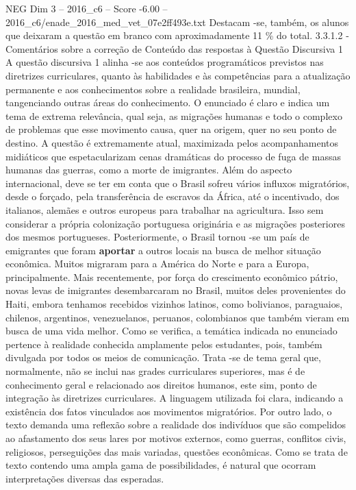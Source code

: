 \begin{textsample}{NEG Dim 3 – 2016\_c6 – Score -6.00 – 2016\_c6/enade\_2016\_med\_vet\_07e2ff493e.txt}
Destacam -se, também, os alunos que deixaram a questão em branco com aproximadamente 11 \% do total. 3.3.1.2 - Comentários sobre a correção de Conteúdo das respostas à Questão Discursiva 1 A questão discursiva 1 alinha -se aos conteúdos programáticos previstos nas diretrizes curriculares, quanto às habilidades e às competências para a atualização permanente e aos conhecimentos sobre a realidade brasileira, mundial, tangenciando outras áreas do conhecimento.
O enunciado é claro e indica um tema de extrema relevância, qual seja, as migrações humanas e todo o complexo de problemas que esse movimento causa, quer na origem, quer no seu ponto de destino.
A questão é extremamente atual, maximizada pelos acompanhamentos midiáticos que espetacularizam cenas dramáticas do processo de fuga de massas humanas das guerras, como a morte de imigrantes.
Além do aspecto internacional, deve se ter em conta que o Brasil sofreu vários influxos migratórios, desde o forçado, pela transferência de escravos da África, até o incentivado, dos italianos, alemães e outros europeus para trabalhar na agricultura.
Isso sem considerar a própria colonização portuguesa originária e as migrações posteriores dos mesmos portugueses.
Posteriormente, o Brasil tornou -se um país de emigrantes que foram \textbf{aportar} a outros locais na busca de melhor situação econômica.
Muitos migraram para a América do Norte e para a Europa, principalmente.
Mais recentemente, por força do crescimento econômico pátrio, novas levas de imigrantes desembarcaram no Brasil, muitos deles provenientes do Haiti, embora tenhamos recebidos vizinhos latinos, como bolivianos, paraguaios, chilenos, argentinos, venezuelanos, peruanos, colombianos que também vieram em busca de uma vida melhor.
Como se verifica, a temática indicada no enunciado pertence à realidade conhecida amplamente pelos estudantes, pois, também divulgada por todos os meios de comunicação.
Trata -se de tema geral que, normalmente, não se inclui nas grades curriculares superiores, mas é de conhecimento geral e relacionado aos direitos humanos, este sim, ponto de integração às diretrizes curriculares.
A linguagem utilizada foi clara, indicando a existência dos fatos vinculados aos movimentos migratórios.
Por outro lado, o texto demanda uma reflexão sobre a realidade dos indivíduos que são compelidos ao afastamento dos seus lares por motivos externos, como guerras, conflitos civis, religiosos, perseguições das mais variadas, questões econômicas.
Como se trata de texto contendo uma ampla gama de possibilidades, é natural que ocorram interpretações diversas das esperadas.

\end{textsample}
